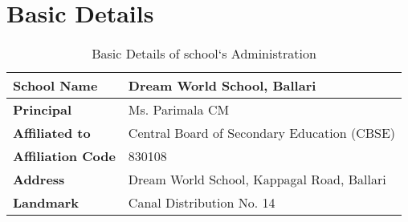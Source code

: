 \section{Basic Details}
\begin{table}[H]
    \centering
    \begin{tabular}{|l|l|} \hline
    \textbf{School Name} & Dream World School, Ballari \\  \hline
    \textbf{Principal} & Ms. Parimala CM\\ \hline
    \textbf{Affiliated to} & Central Board of Secondary Education (CBSE)\\ \hline
    \textbf{Affiliation Code} & 830108\\ \hline
    \textbf{Address} & Dream World School, Kappagal Road, Ballari\\ \hline
    \textbf{Landmark} & Canal Distribution No. 14\\ \hline
    \end{tabular}
    \caption*{Basic Details of school`s Administration}
\end{table}
\normalsize

